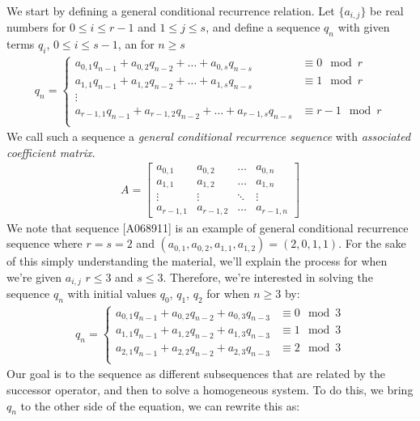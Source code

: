 \documentclass[a4paper]{article}
\theoremstyle{definition}
\begin{document}
We start by defining a general conditional recurrence relation. Let $\{a_{i,j}\}$ be real numbers for $0 \le i \le r-1$ and $1 \le j \le s$, and define a sequence ${q_n}$ with given terms $q_i$, $0 \le i \le s-1$, an for $n \ge s$
\begin{align*}
q_n=
\begin{cases}
a_{0,1}q_{n-1}+a_{0,2}q_{n-2}+\ldots+a_{0,s}q_{n-s}       & \equiv 0   \mod r \\
a_{1,1}q_{n-1}+a_{1,2}q_{n-2}+\ldots+a_{1,s}q_{n-s}       & \equiv 1   \mod r \\
\vdots                                                                        \\
a_{r-1,1}q_{n-1}+a_{r-1,2}q_{n-2}+\ldots+a_{r-1,s}q_{n-s} & \equiv r-1 \mod r \\
\end{cases}
\end{align*}
We call such a sequence a \textit{general conditional recurrence sequence} with \textit{associated coefficient matrix}.
\begin{align*}
A=
\begin{bmatrix}
    a_{0,1}   & a_{0,2}   & \dots  & a_{0,n} \\
    a_{1,1}   & a_{1,2}   & \dots  & a_{1,n} \\
    \vdots    & \vdots    & \ddots & \vdots  \\
    a_{r-1,1} & a_{r-1,2} & \dots  & a_{r-1,n}
\end{bmatrix}
\end{align*}
We note that sequence [A068911] is an example of general conditional recurrence sequence where $r=s=2$ and $(a_{0,1},a_{0,2},a_{1,1},a_{1,2})=(2,0,1,1)$. For the sake of this simply understanding the material, we'll explain the process for when we're given ${a_{i,j}}$ $r \le 3$ and $s \le 3$. Therefore, we're interested in solving the sequence $q_n$ with initial values $q_0$, $q_1$, $q_2$ for when $n \ge 3$ by:
\begin{align*}
q_n=
\begin{cases}
a_{0,1}q_{n-1}+a_{0,2}q_{n-2}+a_{0,3}q_{n-3} & \equiv 0 \mod 3 \\
a_{1,1}q_{n-1}+a_{1,2}q_{n-2}+a_{1,3}q_{n-3} & \equiv 1 \mod 3 \\
a_{2,1}q_{n-1}+a_{2,2}q_{n-2}+a_{2,3}q_{n-3} & \equiv 2 \mod 3 \\
\end{cases}
\end{align*}
Our goal is to the sequence as different subsequences that are related by the successor operator, and then to solve a homogeneous system. To do this, we bring $q_n$ to the other side of the equation, we can rewrite this as:
\end{document}
